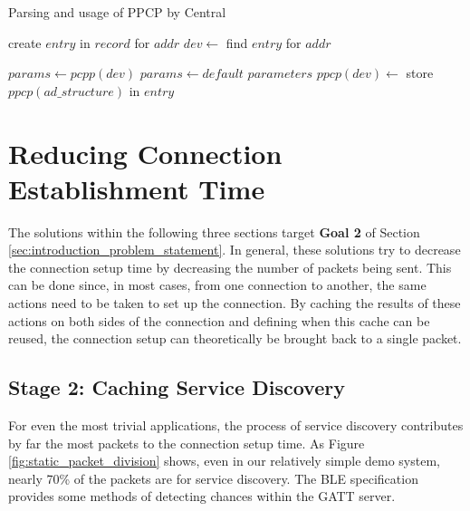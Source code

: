 \begin{algorithm}
    \caption{Parsing and usage of PPCP by Central}
    \label{alg:on_device_found}
    \begin{algorithmic}[1] 
                \State create $entry$ in $record$ for $addr$
            \EndIf
            \State $dev \gets $ find $entry$ for $addr$
            \State {}

                    \State $params \gets \textit{pcpp}(dev)$
                \Else
                    \State $params \gets default$ $parameters$
                \EndIf
                \State {}
            \EndIf
        \EndProcedure
                        \State $\textit{ppcp}(dev) \gets $ store $\textit{ppcp}(ad\_structure)$ in $entry$
                    \EndIf
                \EndIf
            \EndFor
        \EndProcedure
    \end{algorithmic}
\end{algorithm}

\section{Reducing Connection Establishment Time}
The solutions within the following three sections target \textbf{Goal 2} of Section \ref{sec:introduction_problem_statement}. In general, these solutions try to decrease the connection setup time by decreasing the number of packets being sent. This can be done since, in most cases, from one connection to another, the same actions need to be taken to set up the connection. By caching the results of these actions on both sides of the connection and defining when this cache can be reused, the connection setup can theoretically be brought back to a single packet.

\subsection{Stage 2: Caching Service Discovery}
For even the most trivial applications, the process of service discovery contributes by far the most packets to the connection setup time. As Figure \ref{fig:static_packet_division} shows, even in our relatively simple demo system, nearly 70\% of the packets are for service discovery. The BLE specification provides some methods of detecting chances within the GATT server.

